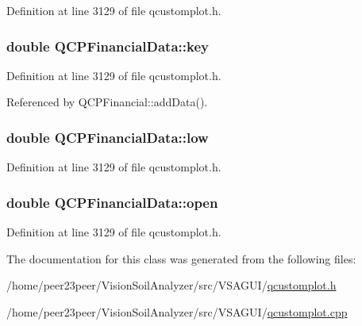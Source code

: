 Definition at line 3129 of file qcustomplot.\+h.

\hypertarget{class_q_c_p_financial_data_a18bc92126f28c214b05b0161e5f5958b}{}
\subsubsection[{key}]{\setlength{\rightskip}{0pt plus 5cm}double Q\+C\+P\+Financial\+Data\+::key}\label{class_q_c_p_financial_data_a18bc92126f28c214b05b0161e5f5958b}


Definition at line 3129 of file qcustomplot.\+h.



Referenced by Q\+C\+P\+Financial\+::add\+Data().

\hypertarget{class_q_c_p_financial_data_aecce0fb45a115e3f3a25eea78491ac16}{}
\subsubsection[{low}]{\setlength{\rightskip}{0pt plus 5cm}double Q\+C\+P\+Financial\+Data\+::low}\label{class_q_c_p_financial_data_aecce0fb45a115e3f3a25eea78491ac16}


Definition at line 3129 of file qcustomplot.\+h.

\hypertarget{class_q_c_p_financial_data_a3059e1e1fbcb9fd243fde0450f238032}{}
\subsubsection[{open}]{\setlength{\rightskip}{0pt plus 5cm}double Q\+C\+P\+Financial\+Data\+::open}\label{class_q_c_p_financial_data_a3059e1e1fbcb9fd243fde0450f238032}


Definition at line 3129 of file qcustomplot.\+h.



The documentation for this class was generated from the following files\+:\begin{DoxyCompactItemize}
\item 
/home/peer23peer/\+Vision\+Soil\+Analyzer/src/\+V\+S\+A\+G\+U\+I/\hyperlink{qcustomplot_8h}{qcustomplot.\+h}\item 
/home/peer23peer/\+Vision\+Soil\+Analyzer/src/\+V\+S\+A\+G\+U\+I/\hyperlink{qcustomplot_8cpp}{qcustomplot.\+cpp}\end{DoxyCompactItemize}
